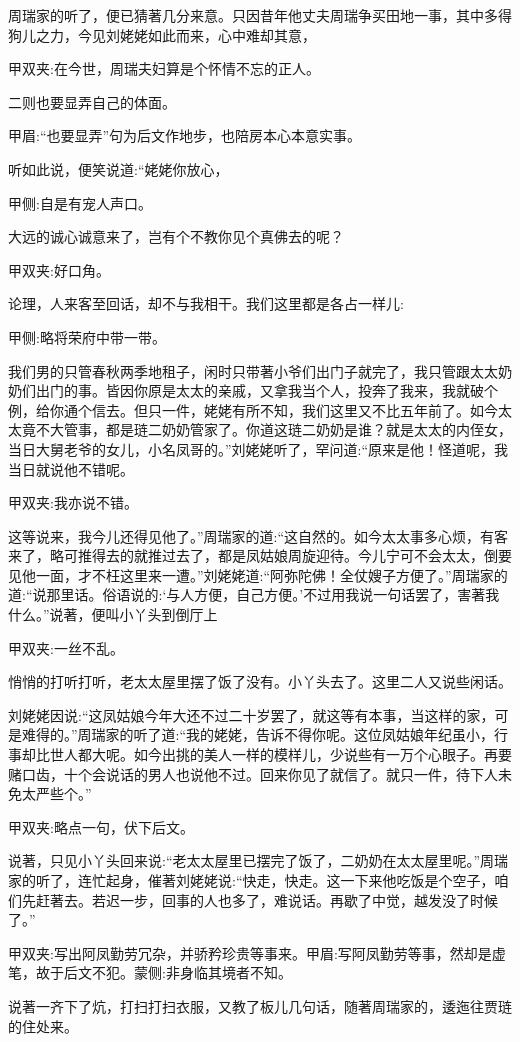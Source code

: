 \begin{parag}
    周瑞家的听了，便已猜著几分来意。只因昔年他丈夫周瑞争买田地一事，其中多得狗儿之力，今见刘姥姥如此而来，心中难却其意，\begin{note}甲双夹:在今世，周瑞夫妇算是个怀情不忘的正人。\end{note}二则也要显弄自己的体面。\begin{note}甲眉:“也要显弄”句为后文作地步，也陪房本心本意实事。\end{note}听如此说，便笑说道:“姥姥你放心，\begin{note}甲侧:自是有宠人声口。\end{note}大远的诚心诚意来了，岂有个不教你见个真佛去的呢？\begin{note}甲双夹:好口角。\end{note}论理，人来客至回话，却不与我相干。我们这里都是各占一样儿:\begin{note}甲侧:略将荣府中带一带。\end{note}我们男的只管春秋两季地租子，闲时只带著小爷们出门子就完了，我只管跟太太奶奶们出门的事。皆因你原是太太的亲戚，又拿我当个人，投奔了我来，我就破个例，给你通个信去。但只一件，姥姥有所不知，我们这里又不比五年前了。如今太太竟不大管事，都是琏二奶奶管家了。你道这琏二奶奶是谁？就是太太的内侄女，当日大舅老爷的女儿，小名凤哥的。”刘姥姥听了，罕问道:“原来是他！怪道呢，我当日就说他不错呢。\begin{note}甲双夹:我亦说不错。\end{note}这等说来，我今儿还得见他了。”周瑞家的道:“这自然的。如今太太事多心烦，有客来了，略可推得去的就推过去了，都是凤姑娘周旋迎待。今儿宁可不会太太，倒要见他一面，才不枉这里来一遭。”刘姥姥道:“阿弥陀佛！全仗嫂子方便了。”周瑞家的道:“说那里话。俗语说的:‘与人方便，自己方便。’不过用我说一句话罢了，害著我什么。”说著，便叫小丫头到倒厅上\begin{note}甲双夹:一丝不乱。\end{note}悄悄的打听打听，老太太屋里摆了饭了没有。小丫头去了。这里二人又说些闲话。
\end{parag}


\begin{parag}
    刘姥姥因说:“这凤姑娘今年大还不过二十岁罢了，就这等有本事，当这样的家，可是难得的。”周瑞家的听了道:“我的姥姥，告诉不得你呢。这位凤姑娘年纪虽小，行事却比世人都大呢。如今出挑的美人一样的模样儿，少说些有一万个心眼子。再要赌口齿，十个会说话的男人也说他不过。回来你见了就信了。就只一件，待下人未免太严些个。”\begin{note}甲双夹:略点一句，伏下后文。\end{note}说著，只见小丫头回来说:“老太太屋里已摆完了饭了，二奶奶在太太屋里呢。”周瑞家的听了，连忙起身，催著刘姥姥说:“快走，快走。这一下来他吃饭是个空子，咱们先赶著去。若迟一步，回事的人也多了，难说话。再歇了中觉，越发没了时候了。”\begin{note}甲双夹:写出阿凤勤劳冗杂，并骄矜珍贵等事来。甲眉:写阿凤勤劳等事，然却是虚笔，故于后文不犯。蒙侧:非身临其境者不知。\end{note}说著一齐下了炕，打扫打扫衣服，又教了板儿几句话，随著周瑞家的，逶迤往贾琏的住处来。
\end{parag}


